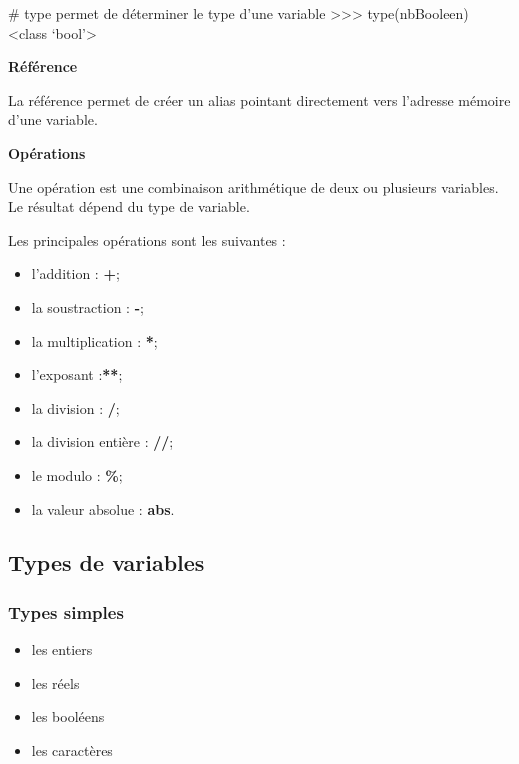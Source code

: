 \documentclass[10pt,fleqn]{article} %
\begin{document}
\begin{exemple}
\begin{minipage}[c]{.9\linewidth}
\begin{py}
\begin{python}
# type permet de déterminer le type d'une variable
>>> type(nbBooleen)
        <class `bool'>
\end{python}
\end{py}

\end{minipage}\hfill
\begin{minipage}[c]{.45\linewidth}
\end{minipage}
\end{exemple}

\begin{defi}
\textbf{Référence}

La référence permet de créer un alias pointant directement vers l'adresse mémoire d'une variable.
\end{defi}

\begin{defi}
\textbf{Opérations}

Une opération est une combinaison arithmétique de deux ou plusieurs variables. Le résultat dépend du type de variable. 

Les principales opérations sont les suivantes : 
\begin{multicols}{2}
\begin{itemize}
\item l'addition : \textbf{+};
\item la soustraction : \textbf{-};
\item la multiplication : \textbf{*};
\item l'exposant :\textbf{**};
\item la division : \textbf{/};
\item la division entière : \textbf{//};
\item le modulo : \textbf{\%};
\item la valeur absolue : \textbf{abs}.
\end{itemize}
\end{multicols}
\end{defi}




\subsection{Types de variables}

\subsubsection{Types simples}
\begin{defi}
\begin{itemize}
\item les entiers
\item les réels
\item les booléens
\item les caractères
\end{itemize}
\end{defi}
\end{document}
